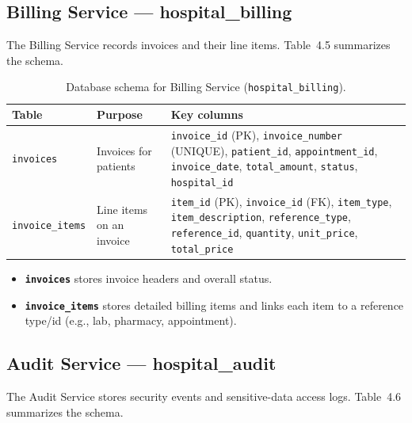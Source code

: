 \subsection{Billing Service — hospital\_billing}
The Billing Service records invoices and their line items. Table~4.5 summarizes the schema.

\begin{table}[H]
\centering
\renewcommand{\arraystretch}{1.2}
\begin{tabular}{|p{3.2cm}|p{5.6cm}|p{5.6cm}|}
\hline
\textbf{Table} & \textbf{Purpose} & \textbf{Key columns} \\
\hline
\texttt{invoices} &
Invoices for patients &
\texttt{invoice\_id} (PK), \texttt{invoice\_number} (UNIQUE), \texttt{patient\_id}, \texttt{appointment\_id}, \texttt{invoice\_date}, \texttt{total\_amount}, \texttt{status}, \texttt{hospital\_id} \\
\hline
\texttt{invoice\_items} &
Line items on an invoice &
\texttt{item\_id} (PK), \texttt{invoice\_id} (FK), \texttt{item\_type}, \texttt{item\_description}, \texttt{reference\_type}, \texttt{reference\_id}, \texttt{quantity}, \texttt{unit\_price}, \texttt{total\_price} \\
\hline
\end{tabular}
\caption{Database schema for Billing Service (\texttt{hospital\_billing}).}
\label{tab:db-schema-billing-service}
\end{table}

\begin{itemize}
  \item \textbf{\texttt{invoices}} stores invoice headers and overall status.
  \item \textbf{\texttt{invoice\_items}} stores detailed billing items and links each item to a reference type/id (e.g., lab, pharmacy, appointment).
\end{itemize}
\subsection{Audit Service — hospital\_audit}
The Audit Service stores security events and sensitive-data access logs. Table~4.6 summarizes the schema.

